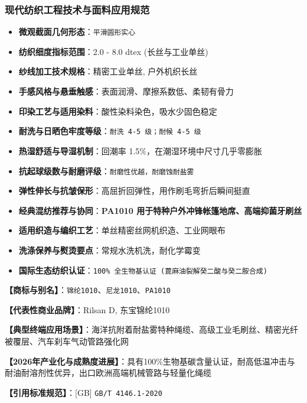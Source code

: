 \documentclass[11pt,openright,twoside,UTF8]{ctexbook}
\begin{document}
\subsubsection*{现代纺织工程技术与面料应用规范}
\begin{itemize} \setlength{\itemsep}{2pt}
    \item \textbf{微观截面几何形态}：\texttt{平滑圆形实心}
    \item \textbf{纺织细度指标范围}：2.0 - 8.0 dtex (长丝与工业单丝)
    \item \textbf{纱线加工技术规格}：精密工业单丝, 户外机织长丝
    \item \textbf{手感风格与悬垂触感}：表面润滑、摩擦系数低、柔韧有骨力
    \item \textbf{印染工艺与适用染料}：酸性染料染色，吸水少固色稳定
    \item \textbf{耐洗与日晒色牢度等级}：\texttt{耐洗 4-5 级；耐候 4-5 级}
    \item \textbf{热湿舒适与导湿机制}：回潮率 1.5\%，在潮湿环境中尺寸几乎零膨胀
    \item \textbf{抗起球级数与耐磨评级}：\texttt{耐磨性优越，耐磨蚀耐盐雾}
    \item \textbf{弹性伸长与抗皱保形}：高屈折回弹性，用作刷毛弯折后瞬间挺直
    \item \textbf{经典混纺推荐与协同}：\textbf{PA1010 用于特种户外冲锋帐篷地席、高端抑菌牙刷丝}
    \item \textbf{适用织造与编织工艺}：单丝精密丝网机织造、工业网眼布
    \item \textbf{洗涤保养与熨烫要点}：常规水洗机洗，耐化学霉变
    \item \textbf{国际生态纺织认证}：\texttt{100\% 全生物基认证 (蓖麻油裂解癸二酸与癸二胺合成)}
\end{itemize}
\vspace{0.2cm}

\noindent\textbf{【商标与别名】}：\texttt{锦纶1010}、\texttt{尼龙1010}、\texttt{PA1010}\par
\noindent\textbf{【代表性商业品牌】}：Rilsan D, 东宝锦纶1010\par
\noindent\textbf{【典型终端应用场景】}：海洋抗附着耐盐雾特种绳缆、高级工业毛刷丝、精密光纤被覆层、汽车刹车气动管路强化网\par
\noindent\textbf{【2026年产业化与成熟度进展】}：具有100\%生物基碳含量认证，耐高低温冲击与耐油耐溶剂性优异，出口欧洲高端机械管路与轻量化绳缆\par
\noindent\textbf{【引用标准规范】}：[GB] \texttt{GB/T 4146.1-2020}\par
\vspace{0.5cm}
\end{document}
